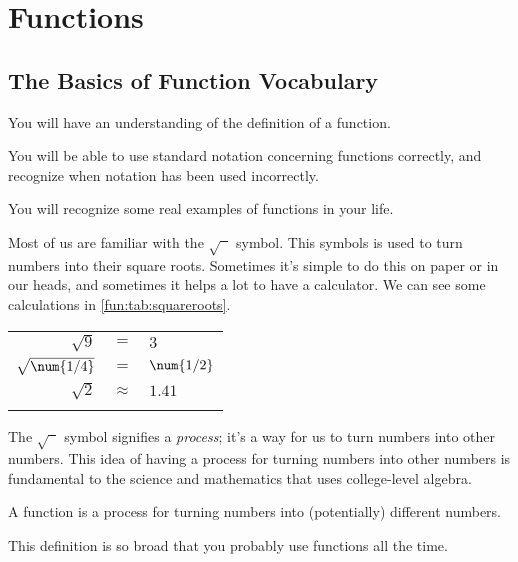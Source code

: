 %
%
\chapter{Functions}
\minitoc
\section{The Basics of Function Vocabulary}
\begin{outcomes}
	\begin{outcomelist}
		\item You will have an understanding of the definition of a function. 
		\item You will be able to use standard notation concerning functions 
		correctly, and recognize when notation has been used incorrectly.
		\item You will recognize some real examples of functions in your life.
	\end{outcomelist}
\end{outcomes}
%
Most of us are familiar with the $\sqrt{\phantom{x}}$ symbol. 
This symbols is used to turn numbers into their square roots. Sometimes it's 
simple to do this on paper or in our heads, and sometimes it helps a lot to 
have a calculator. We can see some calculations in \cref{fun:tab:squareroots}.
%
\begin{margintable}
	\centering
	 \label{fun:tab:squareroots}
	\begin{tabular}{r@{}c@{}l}
		\beforeheading
		\afterheading
		$\sqrt{\num{9}}$   & ${}={}$       & $\num{3}$    \\\normalline
		$\sqrt{\num{1/4}}$ & ${}={}$       & $\num{1/2}$  \\\normalline
		$\sqrt{\num{2}}$   & ${}\approx{}$ & $\num{1.41}$ \\\lastline
	\end{tabular}
\end{margintable}
%
The $\sqrt{\phantom{x}}$ symbol signifies a \emph{process}; it's a way for us to 
turn numbers into other numbers. This idea of having a process for turning numbers into other 
numbers is fundamental to the science and mathematics that uses college-level algebra. 
%
\begin{pccdefinition}[Function]
A function is a process for turning numbers into (potentially) different numbers.
\end{pccdefinition}
%
This definition is so broad that you probably use functions all the time. 

